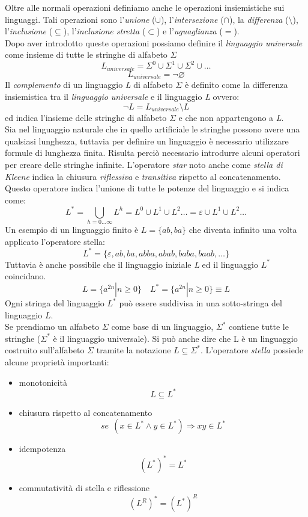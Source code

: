 Oltre alle normali operazioni definiamo anche le operazioni insiemistiche sui linguaggi. Tali operazioni sono l'\emph{unione} ($ \cup $), l'\emph{intersezione} ($ \cap $), la \emph{differenza} ($ \setminus $), l'\emph{inclusione} ($ \subseteq $), l'\emph{inclusione stretta} ($ \subset $) e l'\emph{uguaglianza} ($ = $).\\
Dopo aver introdotto queste operazioni possiamo definire il \emph{linguaggio universale} come insieme di tutte le stringhe di alfabeto $ \Sigma $
$$L_{universale} = \Sigma^0 \cup \Sigma^1 \cup \Sigma^2 \cup \dots$$
$$L_{universale} = \neg \varnothing$$
Il \emph{complemento} di un linguaggio \emph{L} di alfabeto $ \Sigma $ è definito come la differenza insiemistica tra il \emph{linguaggio universale} e il linguaggio \emph{L} ovvero:
$$\neg L = L_{universale}\setminus L$$
ed indica l'insieme delle stringhe di alfabeto $ \Sigma $ e che non appartengono a \emph{L}.\\
Sia nel linguaggio naturale che in quello artificiale le stringhe possono avere una qualsiasi lunghezza, tuttavia per definire un linguaggio è necessario utilizzare formule di lunghezza finita. Risulta perciò necessario introdurre alcuni operatori per creare delle stringhe infinite.
L'operatore \emph{star} noto anche come \emph{stella di Kleene} indica la chiusura \emph{riflessiva} e \emph{transitiva} rispetto al concatenamento. Questo operatore indica l'unione di tutte le potenze del linguaggio e si indica come:
$$L^\ast=\bigcup_{h=0\dots\infty}L^h = L^0\cup L^1 \cup L^2 \dots = \varepsilon \cup L^1 \cup L^2 \dots $$
Un esempio di un linguaggio finito è $L = \{ab,ba\}$ che diventa infinito una volta applicato l'operatore stella:
$$L^\ast = \{\varepsilon,ab,ba,abba,abab,baba,baab,\dots\}$$
Tuttavia è anche possibile che il linguaggio iniziale \emph{L} ed il linguaggio $ L^\ast $ coincidano.
$$L= \{a^{2n}| n\geq 0\} \quad L^\ast = \{a^{2n}| n\geq 0\} \equiv L$$
Ogni stringa del linguaggio $ L^\ast $ può essere suddivisa in una sotto-stringa del linguaggio $ L $.\\
Se prendiamo un alfabeto $ \Sigma $ come base di un linguaggio, $ \Sigma^\ast $ contiene tutte le stringhe ($ \Sigma^\ast $ è il linguaggio universale). Si può anche dire che L è un linguaggio costruito sull'alfabeto $ \Sigma $ tramite la notazione $ L\subseteq \Sigma^\ast$.
L'operatore \emph{stella} possiede alcune proprietà importanti:
\begin{itemize}
	\item monotonicità
	$$L\subseteq L^\ast$$
	\item chiusura rispetto al concatenamento
	$$se \ \ (x\in L^\ast \wedge y \in L^\ast) \Rightarrow xy \in L^\ast$$
	\item idempotenza
	$$(L^\ast)^\ast = L^\ast$$
	\item commutatività di stella e riflessione
	$$(L^R)^\ast = (L^\ast)^R$$
\end{itemize}

